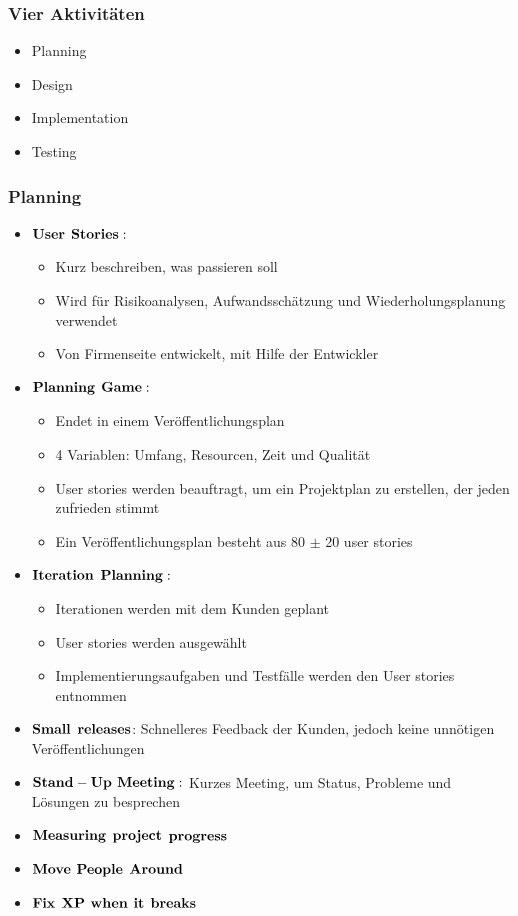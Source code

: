 \subsubsection{Vier Aktivitäten}
\begin{itemize}
	\item Planning
	\item Design
	\item Implementation
	\item Testing
\end{itemize}
\subsubsection{Planning}
\begin{itemize}
	\item $\bold{User}$ $\bold{Stories:}$
		\begin{itemize}
			\item Kurz beschreiben, was passieren soll
			\item Wird für Risikoanalysen, Aufwandsschätzung und Wiederholungsplanung verwendet
			\item Von Firmenseite entwickelt, mit Hilfe der Entwickler
		\end{itemize}
	\item $\bold{Planning}$ $\bold{Game:}$ 
		\begin{itemize}
			\item Endet in einem Veröffentlichungsplan
			\item 4 Variablen: Umfang, Resourcen, Zeit und Qualität
			\item User stories werden beauftragt, um ein Projektplan zu erstellen, der jeden zufrieden stimmt
			\item Ein Veröffentlichungsplan besteht aus 80 $\pm$ 20 user stories
		\end{itemize}
	\item $\bold{Iteration}$ $\bold{Planning:}$
		\begin{itemize}
			\item Iterationen werden mit dem Kunden geplant
			\item User stories werden ausgewählt
			\item Implementierungsaufgaben und Testfälle werden den User stories entnommen
		\end{itemize}
	\item $\bold{Small}$ $\bold{releases}$: Schnelleres Feedback der Kunden, jedoch keine unnötigen Veröffentlichungen
	\item $\bold{Stand-Up}$ $\bold{Meeting:}$ Kurzes Meeting, um Status, Probleme und Lösungen zu besprechen
	\item $\bold{Measuring}$ $\bold{project}$ $\bold{progress}$
	\item $\bold{Move}$ $\bold{People}$ $\bold{Around}$
	\item $\bold{Fix}$ $\bold{XP}$ $\bold{when}$ $\bold{it}$ $\bold{breaks}$
\end{itemize}
